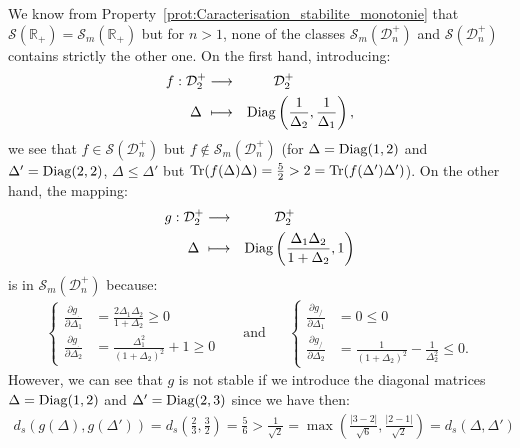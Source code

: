 \documentclass[a4papaer, titlepage]{book}
\begin{document}
 \begin{remark}\label{rem:sub_monotonuous_and_stable_class}
   We know from Property~\ref{prot:Caracterisation_stabilite_monotonie} that $\mathcal S(\mathbb R_+)= \mathcal S_m(\mathbb R_+)$ but for $n>1$, none of the classes $\mathcal S_m(\mathcal D_n^+)$ and $\mathcal S(\mathcal D_n^+)$ contains strictly the other one. On the first hand, introducing:
   \begin{align*}
     f: \begin{aligned}[t]
       \mathcal D_2^+ & \longrightarrow& \mathcal D_2^+ \hspace{1.5cm}\\
       \Delta \ & \longmapsto& \operatorname{Diag} \left(\frac{1}{\Delta_2}, \frac{1}{\Delta_1}\right),
     \end{aligned}
   \end{align*}
   we see that $f \in \mathcal S(\mathcal D_n^+)$ but $f \notin \mathcal S_m(\mathcal D_n^+)$ (for $\Delta = \operatorname{Diag}(1,2)$ and $\Delta' = \operatorname{Diag}(2, 2)$, $\Delta \leq \Delta'$ but $\operatorname{Tr}(f(\Delta)\Delta) = \frac{5}{2} > 2 = \operatorname{Tr}(f(\Delta')\Delta')$). On the other hand, the mapping:
   \begin{align*}
     g: \begin{aligned}[t]
       \mathcal D_2^+ & \longrightarrow& \mathcal D_2^+ \hspace{1.5cm}\\
       \Delta \ & \longmapsto& \operatorname{Diag} \left(\frac{\Delta_1\Delta_2}{1+\Delta_2}, 1\right)
     \end{aligned}
   \end{align*}
   is in $\mathcal S_m(\mathcal D_n^+)$ because:
   \begin{align*}
     \left\{\begin{aligned}
       \frac{\partial g_.}{\partial \Delta_1} &= \frac{2\Delta_1\Delta_2}{1+\Delta_2} \geq 0\\
       \frac{\partial g_.}{\partial \Delta_2} &= \frac{\Delta_1^2}{(1+\Delta_2)^2} + 1 \geq 0
     \end{aligned}\right.&
     &\text{and}&
     &\left\{\begin{aligned}
       \frac{\partial g_/}{\partial \Delta_1} &= 0\leq 0\\
       \frac{\partial g_/}{\partial \Delta_2} &= \frac{1}{(1+\Delta_2)^2} - \frac{1}{\Delta_2^2} \leq 0.
     \end{aligned}\right.
   \end{align*}
   However, we can see that $g$ is not stable if we introduce the diagonal matrices $\Delta = \operatorname{Diag}(1,2)$ and $\Delta' = \operatorname{Diag}(2, 3)$ since we have then:
   \begin{align*}
     d_s(g(\Delta), g(\Delta')) = d_s \left(\frac{2}{3},\frac{3}{2}\right)  = \frac{5}{6} > \frac{1}{\sqrt 2} = \max \left(\frac{|3-2|}{\sqrt {6}}, \frac{|2-1|}{\sqrt 2}\right) = d_s(\Delta, \Delta')
   \end{align*}
 \end{remark}
\end{document}
